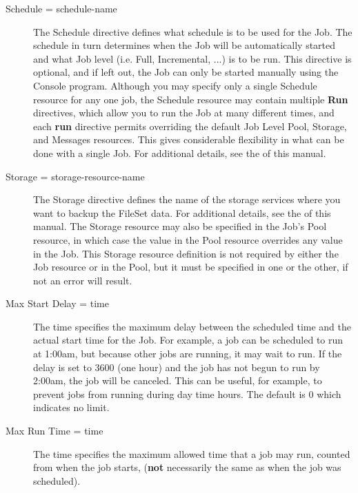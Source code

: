\begin{description}
\item [Schedule = \lt{}schedule-name\gt{}]
   The Schedule directive defines what schedule is to be used for the Job.
   The schedule in turn determines when the Job will be automatically
   started and what Job level (i.e.  Full, Incremental, ...) is to be run.
   This directive is optional, and if left out, the Job can only be started
   manually using the Console program.  Although you may specify only a
   single Schedule resource for any one job, the Schedule resource may
   contain multiple {\bf Run} directives, which allow you to run the Job at
   many different times, and each {\bf run} directive permits overriding
   the default Job Level Pool, Storage, and Messages resources.  This gives
   considerable flexibility in what can be done with a single Job.  For
   additional details, see the  of this manual.
          

\item [Storage = \lt{}storage-resource-name\gt{}]
   The Storage directive defines the name of the storage services where you
   want to backup the FileSet data.  For additional details, see the
    of this manual.
   The Storage resource may also be specified in the Job's Pool resource,
   in which case the value in the Pool resource overrides any value
   in the Job. This Storage resource definition is not required by either
   the Job resource or in the Pool, but it must be specified in
   one or the other, if not an error will result.

\item [Max Start Delay = \lt{}time\gt{}]
   The time specifies the maximum delay between the scheduled time and the
   actual start time for the Job.  For example, a job can be scheduled to
   run at 1:00am, but because other jobs are running, it may wait to run.
   If the delay is set to 3600 (one hour) and the job has not begun to run
   by 2:00am, the job will be canceled.  This can be useful, for example,
   to prevent jobs from running during day time hours.  The default is 0
   which indicates no limit.

\item [Max Run Time = \lt{}time\gt{}]
   The time specifies the maximum allowed time that a job may run, counted
   from when the job starts, ({\bf not} necessarily the same as when the
   job was scheduled). 


\end{description}

